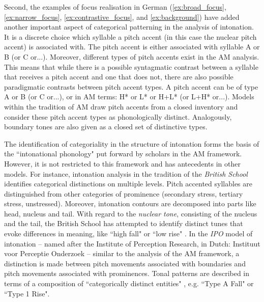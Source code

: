 Second, the examples of focus realisation in German (\ref{ex:broad_focus}, \ref{ex:narrow_focus}, \ref{ex:contrastive_focus}, and \ref{ex:background}) have added another important aspect of categorical patterning in the analysis of intonation. It is a discrete choice which syllable a pitch accent (in this case the nuclear pitch accent) is associated with. The pitch accent is either associated with syllable A or B (or C or...). Moreover, different types of pitch accents exist in the AM analysis. This means that while there is a possible syntagmatic contrast between a syllable that receives a pitch accent and one that does not, there are also possible paradigmatic contrasts between pitch accent types. A pitch accent can be of type A or B (or C or...), or in AM terms: H* or L* or H+L* (or L+H* or...). Models within the tradition of AM draw pitch accents from a closed inventory and consider these pitch accent types as phonologically distinct. Analogously, boundary tones are also given as a closed set of distinctive types.

The identification of categoriality in the structure of intonation forms the basis of the ``intonational phonology" \citep{Ladd2008} put forward by scholars in the AM framework. However, it is not restricted to this framework and has antecedents in other models. For instance, intonation analysis in the tradition of the \emph{British School} \citep{OConnorArnold1973} identifies categorical distinctions on multiple levels. Pitch accented syllables are distinguished from other categories of prominence (secondary stress, tertiary stress, unstressed). Moreover, intonation contours are decomposed into parts like head, nucleus and tail. With regard to the \emph{nuclear tone}, consisting of the nucleus and the tail, the British School has attempted to identify distinct tunes that evoke differences in meaning, like ``high fall" or ``low rise" \citep{Cruttenden1997}. In the \emph{IPO} model of intonation \citep{tHartCollierCohen1990} -- named after the Institute of Perception Research, in Dutch: Instituut voor Perceptie Onderzoek -- similar to the analysis of the AM framework, a distinction is made between pitch movements associated with boundaries and pitch movements associated with prominences. Tonal patterns are described in terms of a composition of ``categorically distinct entities" \citep[14]{Ladd2008}, e.g. ``Type A Fall" or ``Type 1 Rise". 

